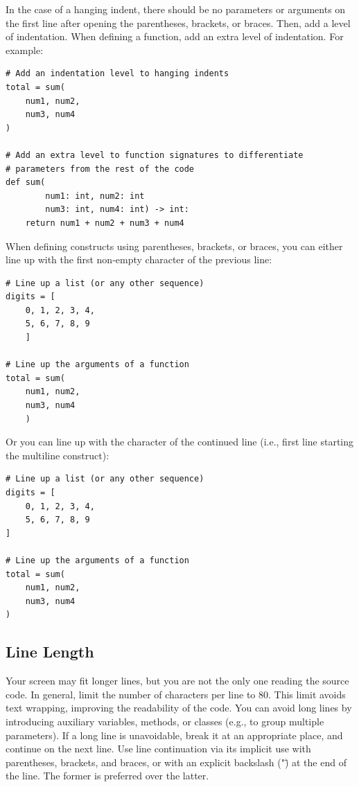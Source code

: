 \documentclass{tufte-handout}
\begin{document}
In the case of a hanging indent, there should be no parameters or arguments on the first line after opening the parentheses, brackets, or braces.
Then, add a level of indentation.
When defining a function, add an extra level of indentation.
For example:

\begin{mdframed}
\begin{verbatim}
# Add an indentation level to hanging indents
total = sum(
    num1, num2,
    num3, num4
)

# Add an extra level to function signatures to differentiate 
# parameters from the rest of the code
def sum(
        num1: int, num2: int
        num3: int, num4: int) -> int:
    return num1 + num2 + num3 + num4
\end{verbatim}
\end{mdframed}

When defining constructs using parentheses, brackets, or braces, you can either line up with the first non-empty character of the previous line:

\begin{mdframed}
\begin{verbatim}
# Line up a list (or any other sequence)
digits = [
    0, 1, 2, 3, 4,
    5, 6, 7, 8, 9 
    ]
    
# Line up the arguments of a function
total = sum(
    num1, num2,
    num3, num4
    )
\end{verbatim}
\end{mdframed}

Or you can line up with the character of the continued line (i.e., first line starting the multiline construct):

\begin{mdframed}
\begin{verbatim}
# Line up a list (or any other sequence)
digits = [
	0, 1, 2, 3, 4,
	5, 6, 7, 8, 9 
]
	
# Line up the arguments of a function
total = sum(
	num1, num2,
	num3, num4
)
\end{verbatim}
\end{mdframed}

\subsection{Line Length}
Your screen may fit longer lines, but you are not the only one reading the source code.
In general, limit the number of characters per line to 80.
This limit avoids text wrapping, improving the readability of the code.
You can avoid long lines by introducing auxiliary variables, methods, or classes (e.g., to group multiple parameters).
If a long line is unavoidable, break it at an appropriate place, and continue on the next line.
Use line continuation via its implicit use with parentheses, brackets, and braces, or with an explicit backslash ("\") at the end of the line.
The former is preferred over the latter.
\end{document}

